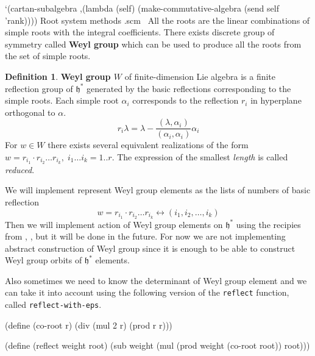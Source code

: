 \documentclass[a4paper,10pt]{article}
\theoremstyle{definition} \newtheorem{Def}{Definition}
\begin{document}
`(cartan-subalgebra ,(lambda (self)
    (make-commutative-algebra (send self 'rank))))
\LA{}Root system methods .scm~{\nwtagstyle{}}\RA{}
\nwendcode{}\nwdocspar
All the roots are the linear combinations of simple roots with the integral coefficients. There exists discrete group of symmetry called {\bf Weyl group} which can be used to produce all the roots from the set of simple roots. 
\begin{Def}
  \label{weyl-group-def}
  {\bf Weyl group $W$} of finite-dimension Lie algebra is a finite reflection group of $\mathfrak{h}^*$ generated by the basic reflections corresponding to the simple roots. 
  Each simple root $\alpha_i$ corresponds to the reflection $r_{i}$ in hyperplane orthogonal to $\alpha$.
  \begin{equation}
    \label{eq:5}
    r_{i}\lambda=\lambda-\frac{(\lambda,\alpha_i)}{(\alpha_i,\alpha_i)}\alpha_i
  \end{equation}
  For $w\in W$ there exists several equivalent realizations of the form $w=r_{i_1}\cdot r_{i_2}\dots r_{i_k},\; i_1\dots i_k=1..r$. The expression of the smallest {\it length} is called {\it reduced}. 
\end{Def}
We will implement represent Weyl group elements as the lists of numbers of basic reflection
\begin{equation}
  \label{eq:6}
  w=r_{i_1}\cdot r_{i_2}\dots r_{i_k} \leftrightarrow (i_1, i_2,\dots,i_k)
\end{equation}
Then we will implement action of Weyl group elements on $\mathfrak{h}^*$ using the recipies from \cite{stembridge2001computational}, \cite{casselman1994machine}, but it will be done in the future. For now we are not implementing abstract construction of Weyl group since it is enough to be able to construct Weyl group orbits of $\mathfrak{h}^*$ elements.

Also sometimes we need to know the determinant of Weyl group element and we can take it into account using the following version of the {\tt{}reflect} function, called {\tt{}reflect-with-eps}.

\nwenddocs{}\endmoddef
(define (co-root r)
  (div (mul 2 r) (prod r r)))

(define (reflect weight root)
  (sub weight (mul (prod weight (co-root root)) root)))
\end{document}
